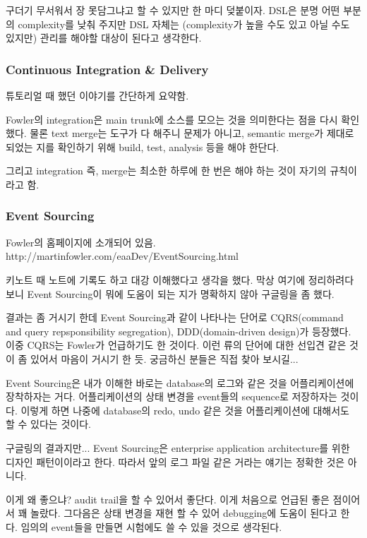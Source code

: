 \documentclass[a4paper]{article}
\begin{document}
구더기 무서워서 장 못담그냐고 할 수 있지만 한 마디 덪붙이자. DSL은 분명
어떤 부분의 complexity를 낮춰 주지만 DSL 자체는 (complexity가 높을 수도
있고 아닐 수도 있지만) 관리를 해야할 대상이 된다고 생각한다.
 
\subsubsection{Continuous Integration \& Delivery}
 
튜토리얼 때 했던 이야기를 간단하게 요약함. 
 
Fowler의 integration은 main trunk에 소스를 모으는 것을 의미한다는 점을
다시 확인했다.  물론 text merge는 도구가 다 해주니 문제가 아니고,
semantic merge가 제대로 되었는 지를 확인하기 위해 build, test,
analysis 등을 해야 한단다.
 
그리고 integration 즉, merge는 최소한 하루에 한 번은 해야 하는 것이
자기의 규칙이라고 함.
 
\subsubsection{Event Sourcing}
 
Fowler의 홈페이지에 소개되어 있음.
http://martinfowler.com/eaaDev/EventSourcing.html
 
키노트 때 노트에 기록도 하고 대강 이해했다고 생각을 했다. 막상 여기에
정리하려다 보니 Event Sourcing이 뭐에 도움이 되는 지가 명확하지 않아
구글링을 좀 했다.
 
결과는 좀 거시기 한데 Event Sourcing과 같이 나타나는 단어로
CQRS(command and query repsponsibility segregation), DDD(domain-driven
design)가 등장했다. 이중 CQRS는 Fowler가 언급하기도 한 것이다. 이런
류의 단어에 대한 선입견 같은 것이 좀 있어서 마음이 거시기 한
듯. 궁금하신 분들은 직접 찾아 보시길...
 
Event Sourcing은 내가 이해한 바로는 database의 로그와 같은 것을
어플리케이션에 장착하자는 거다. 어플리케이션의 상태 변경을 event들의
sequence로 저장하자는 것이다. 이렇게 하면 나중에 database의 redo, undo
같은 것을 어플리케이션에 대해서도 할 수 있다는 것이다.
 
구글링의 결과지만... Event Sourcing은 enterprise application
architecture를 위한 디자인 패턴이이라고 한다. 따라서 앞의 로그 파일
같은 거라는 얘기는 정확한 것은 아니다.
 
이게 왜 좋으냐? audit trail을 할 수 있어서 좋단다. 이게 처음으로 언급된
좋은 점이어서 꽤 놀랐다. 그다음은 상태 변경을 재현 할 수 있어
debugging에 도움이 된다고 한다.  임의의 event들을 만들면 시험에도 쓸 수
있을 것으로 생각된다.
\end{document}
